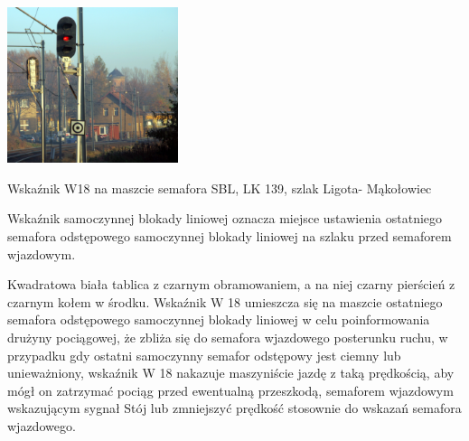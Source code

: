 	\begin{marginfigure}
	\includegraphics[width=5cm]{skryptkierownik-img/skryptkierownik-img017.jpg}
	\caption{Wskaźnik W18 na maszcie semafora SBL, LK 139, szlak Ligota- Mąkołowiec}
\end{marginfigure}
\begin{tcolorbox}[colback=black!5!white,colframe=white!55!black,title=Wskaźnik W18] {\textquotedbl}Wskaźnik samoczynnej blokady liniowej{\textquotedbl} oznacza miejsce ustawienia ostatniego semafora odstępowego samoczynnej blokady liniowej na szlaku przed semaforem wjazdowym. 
\end{tcolorbox}
Kwadratowa biała tablica z czarnym obramowaniem, a na niej czarny pierścień z czarnym kołem w środku. Wskaźnik W 18 umieszcza się na maszcie ostatniego semafora odstępowego samoczynnej blokady liniowej w celu poinformowania drużyny pociągowej, że zbliża się do semafora wjazdowego posterunku ruchu, w przypadku gdy ostatni samoczynny semafor odstępowy jest ciemny lub
unieważniony, wskaźnik W 18 nakazuje maszyniście jazdę z taką prędkością, aby mógł on zatrzymać pociąg przed ewentualną przeszkodą, semaforem wjazdowym wskazującym sygnał {\textquotedbl}Stój{\textquotedbl} lub zmniejszyć prędkość stosownie do wskazań semafora wjazdowego.

